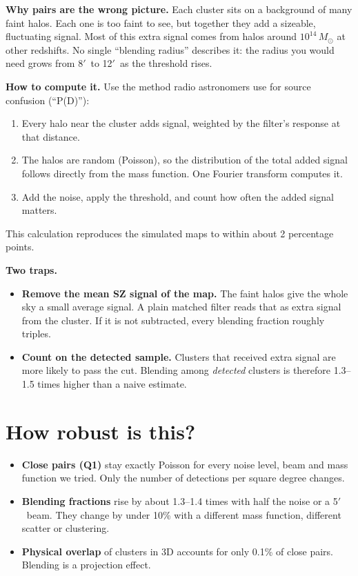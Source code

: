 \documentclass[10pt]{article}
\newcommand{\amin}{$'$}
\begin{document}
\textbf{Why pairs are the wrong picture.} Each cluster sits on a background of many faint halos. Each one is too faint to see, but together they add a sizeable, fluctuating signal. Most of this extra signal comes from halos around $10^{14}\,M_\odot$ at other redshifts. No single ``blending radius'' describes it: the radius you would need grows from 8\amin\ to 12\amin\ as the threshold rises.

\textbf{How to compute it.} Use the method radio astronomers use for source confusion (``P(D)''):
\begin{enumerate}[itemsep=1pt]
\item Every halo near the cluster adds signal, weighted by the filter's response at that distance.
\item The halos are random (Poisson), so the distribution of the total added signal follows directly from the mass function. One Fourier transform computes it.
\item Add the noise, apply the threshold, and count how often the added signal matters.
\end{enumerate}
This calculation reproduces the simulated maps to within about 2 percentage points.

\textbf{Two traps.}
\begin{itemize}
\item \textbf{Remove the mean SZ signal of the map.} The faint halos give the whole sky a small average signal. A plain matched filter reads that as extra signal from the cluster. If it is not subtracted, every blending fraction roughly triples.
\item \textbf{Count on the detected sample.} Clusters that received extra signal are more likely to pass the cut. Blending among \emph{detected} clusters is therefore 1.3--1.5 times higher than a naive estimate.
\end{itemize}

\section{How robust is this?}
\begin{itemize}
\item \textbf{Close pairs (Q1)} stay exactly Poisson for every noise level, beam and mass function we tried. Only the number of detections per square degree changes.
\item \textbf{Blending fractions} rise by about 1.3--1.4 times with half the noise or a 5\amin\ beam. They change by under 10\% with a different mass function, different scatter or clustering.
\item \textbf{Physical overlap} of clusters in 3D accounts for only 0.1\% of close pairs. Blending is a projection effect.
\end{itemize}
\end{document}
